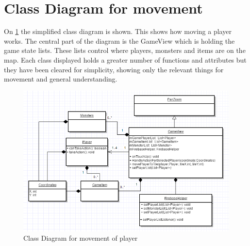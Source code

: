 \section{Class Diagram for movement}

On \ref{ClassDiagramMovement} the simplified class diagram is shown. This shows how moving a player works. The central part of the diagram is the GameView which is holding the game state lists. These lists control where players, monsters and items are on the map. Each class displayed holds a greater number of functions and attributes but they have been cleared for simplicity, showing only the relevant things for movement and general understanding.


\begin{figure}
	\centering
	\includegraphics[width=130mm]{images/ClassDiagramMovement.PNG}
	\caption{Class Diagram for movement of player \label{ClassDiagramMovement}}
\end{figure}